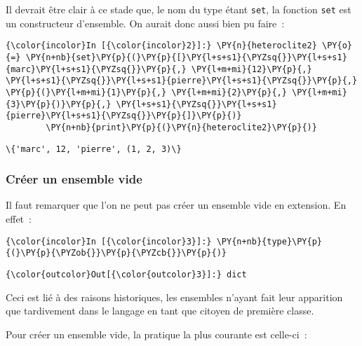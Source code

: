     Il devrait être clair à ce stade que, le nom du type étant \texttt{set},
la fonction \texttt{set} est un constructeur d'ensemble. On aurait donc
aussi bien pu faire~:

    \begin{Verbatim}[commandchars=\\\{\}]
{\color{incolor}In [{\color{incolor}2}]:} \PY{n}{heteroclite2} \PY{o}{=} \PY{n+nb}{set}\PY{p}{(}\PY{p}{[}\PY{l+s+s1}{\PYZsq{}}\PY{l+s+s1}{marc}\PY{l+s+s1}{\PYZsq{}}\PY{p}{,} \PY{l+m+mi}{12}\PY{p}{,} \PY{l+s+s1}{\PYZsq{}}\PY{l+s+s1}{pierre}\PY{l+s+s1}{\PYZsq{}}\PY{p}{,} \PY{p}{(}\PY{l+m+mi}{1}\PY{p}{,} \PY{l+m+mi}{2}\PY{p}{,} \PY{l+m+mi}{3}\PY{p}{)}\PY{p}{,} \PY{l+s+s1}{\PYZsq{}}\PY{l+s+s1}{pierre}\PY{l+s+s1}{\PYZsq{}}\PY{p}{]}\PY{p}{)}
        \PY{n+nb}{print}\PY{p}{(}\PY{n}{heteroclite2}\PY{p}{)}
\end{Verbatim}


    \begin{Verbatim}[commandchars=\\\{\}]
\{'marc', 12, 'pierre', (1, 2, 3)\}

    \end{Verbatim}

    \hypertarget{cruxe9er-un-ensemble-vide}{%
\subsubsection{Créer un ensemble vide}\label{cruxe9er-un-ensemble-vide}}

    Il faut remarquer que l'on ne peut pas créer un ensemble vide en
extension. En effet~:

    \begin{Verbatim}[commandchars=\\\{\}]
{\color{incolor}In [{\color{incolor}3}]:} \PY{n+nb}{type}\PY{p}{(}\PY{p}{\PYZob{}}\PY{p}{\PYZcb{}}\PY{p}{)}
\end{Verbatim}


\begin{Verbatim}[commandchars=\\\{\}]
{\color{outcolor}Out[{\color{outcolor}3}]:} dict
\end{Verbatim}
            
    Ceci est lié à des raisons historiques, les ensembles n'ayant fait leur
apparition que tardivement dans le langage en tant que citoyen de
première classe.

    Pour créer un ensemble vide, la pratique la plus courante est celle-ci~:

